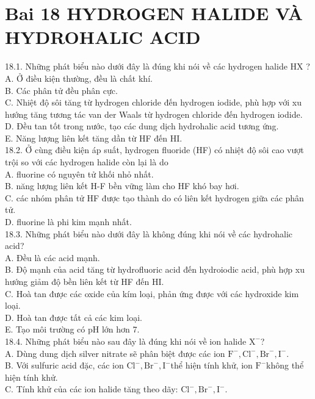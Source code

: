 \documentclass[10pt]{article}
\begin{document}
\section*{Bai 18 HYDROGEN HALIDE VÀ HYDROHALIC ACID}
18.1. Những phát biểu nào dưới đây là đúng khi nói về các hydrogen halide HX ?\\
A. Ở điều kiện thường, đều là chất khí.\\
B. Các phân tử đều phân cực.\\
C. Nhiệt độ sôi tăng từ hydrogen chloride đến hydrogen iodide, phù hợp với xu hướng tăng tương tác van der Waals từ hydrogen chloride đến hydrogen iodide.\\
D. Đều tan tốt trong nước, tạo các dung dịch hydrohalic acid tương ứng.\\
E. Năng lượng liên kết tăng dần từ HF đến HI.\\
18.2. Ở cùng điều kiện áp suất, hydrogen fluoride (HF) có nhiệt độ sôi cao vượt trội so với các hydrogen halide còn lại là do\\
A. fluorine có nguyên tử khối nhỏ nhất.\\
B. năng lượng liên kết H-F bền vững làm cho HF khó bay hơi.\\
C. các nhóm phân tử HF được tạo thành do có liên kết hydrogen giữa các phân tử.\\
D. fluorine là phi kim mạnh nhất.\\
18.3. Những phát biểu nào dưới đây là không đúng khi nói về các hydrohalic acid?\\
A. Đều là các acid mạnh.\\
B. Độ mạnh của acid tăng từ hydrofluoric acid đến hydroiodic acid, phù hợp xu hướng giảm độ bền liên kết từ HF đến HI.\\
C. Hoà tan được các oxide của kím loại, phản ứng được với các hydroxide kim loại.\\
D. Hoà tan được tất cả các kim loại.\\
E. Tạo môi trường có pH lớn hơn 7.\\
18.4. Những phát biểu nào sau đây là đúng khi nói về ion halide $\mathrm{X}^{-}$?\\
A. Dùng dung dịch silver nitrate sẽ phân biệt được các ion $\mathrm{F}^{-}, \mathrm{Cl}^{-}, \mathrm{Br}^{-}, \mathrm{I}^{-}$.\\
B. Với sulfuric acid đặc, các ion $\mathrm{Cl}^{-}, \mathrm{Br}^{-}, \mathrm{I}^{-}$thể hiện tính khử, ion $\mathrm{F}^{-}$không thể hiện tính khử.\\
C. Tính khử của các ion halide tăng theo dãy: $\mathrm{Cl}^{-}, \mathrm{Br}^{-}, \mathrm{I}^{-}$.\\
\end{document}
